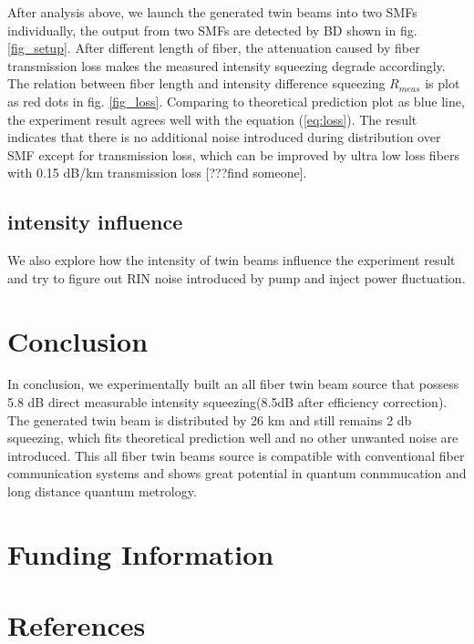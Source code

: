 \documentclass[9pt,twocolumn,twoside]{osajnl}
\begin{document}
After analysis above, we launch the generated twin beams into two SMFs individually, the output from two SMFs are detected by BD shown in fig. \ref{fig_setup}.
After different length of fiber, the attenuation caused by fiber transmission loss makes the measured intensity squeezing degrade accordingly.
The relation between fiber length and intensity difference squeezing $R_{meas}$ is plot as red dots in fig. \ref{fig_loss}.
Comparing to theoretical prediction plot as blue line, the experiment result agrees well with the equation (\ref{eq:loss}).
The result indicates that there is no additional noise introduced during distribution over SMF except for transmission loss, which can be improved by ultra low loss fibers with 0.15 dB/km transmission loss [???find someone].

\subsection{intensity influence}
We also explore how the intensity of twin beams influence the experiment result and try to figure out RIN noise introduced by pump and inject power fluctuation.



\section{Conclusion}
In conclusion, we experimentally built an all fiber twin beam source that possess 5.8 dB direct measurable intensity squeezing(8.5dB after efficiency correction).
The generated twin beam is distributed by 26 km and still remains 2 db squeezing, which fits theoretical prediction well and no other unwanted noise are introduced.
This all fiber twin beams source is compatible with conventional fiber communication systems and shows great potential in quantum conmmucation and long distance quantum metrology.


\section{Funding Information}


\section{References}
\end{document}
